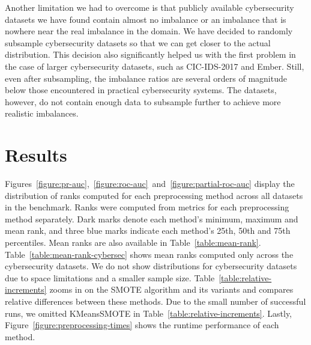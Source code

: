 \documentclass[conference]{IEEEtran}
\begin{document}
Another limitation we had to overcome is that publicly available cybersecurity datasets we have
found contain almost no imbalance or an imbalance that is nowhere near the real imbalance in the
domain. We have decided to randomly subsample cybersecurity datasets so that we can get closer to
the actual distribution. This decision also significantly helped us with the first problem in the
case of larger cybersecurity datasets, such as CIC-IDS-2017 and Ember. Still, even after
subsampling, the imbalance ratios are several orders of magnitude below those encountered in
practical cybersecurity systems. The datasets, however, do not contain enough data to subsample
further to achieve more realistic imbalances.


\section{Results}
\label{section:results}

Figures~\ref{figure:pr-auc},~\ref{figure:roc-auc}~and~\ref{figure:partial-roc-auc} display the
distribution of ranks computed for each preprocessing method across all datasets in the benchmark.
Ranks were computed from metrics for each preprocessing method separately. Dark marks denote each
method's minimum, maximum and mean rank, and three blue marks indicate each method's 25th, 50th and
75th percentiles. Mean ranks are also available in Table~\ref{table:mean-rank}.
Table~\ref{table:mean-rank-cybersec} shows mean ranks computed only across the cybersecurity
datasets. We do not show distributions for cybersecurity datasets due to space limitations and a
smaller sample size. Table~\ref{table:relative-increments} zooms in on the SMOTE algorithm and its
variants and compares relative differences between these methods. Due to the small number of
successful runs, we omitted KMeansSMOTE in Table~\ref{table:relative-increments}. Lastly,
Figure~\ref{figure:preprocessing-times} shows the runtime performance of each method.

\end{document}
